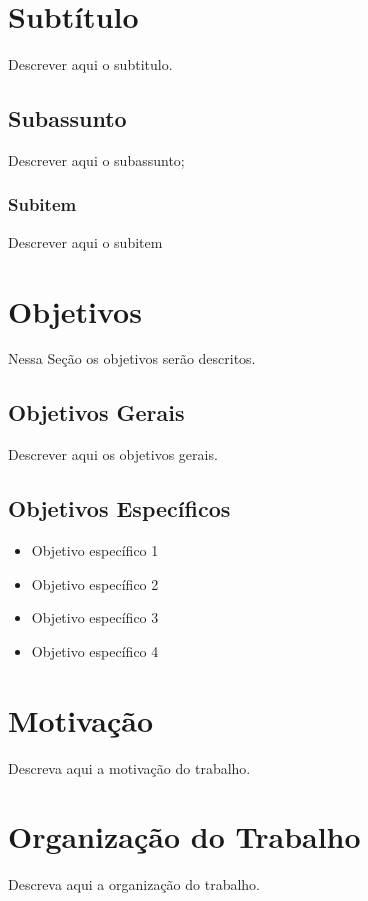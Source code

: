 \section{Subtítulo}\label{sec:subtitutlo}
Descrever aqui o subtitulo.
\subsection{Subassunto}\label{subsec:subassunto}
Descrever aqui o subassunto;
\subsubsection{Subitem}\label{subsubsec:subitem}
Descrever aqui o subitem

\section{Objetivos}\label{sec:objetivos}
Nessa Seção os objetivos serão descritos.
\subsection{Objetivos Gerais}\label{subsec:objetivos_gerais}
Descrever aqui os objetivos gerais.
\subsection{Objetivos Específicos}\label{subsec:objetivos_especificos}
\begin{itemize}
	\setlength\itemsep{-0.17cm}
	\item Objetivo específico 1
	\item Objetivo específico 2
	\item Objetivo específico 3
	\item Objetivo específico 4
\end{itemize}

\section{Motivação}\label{sec:motivacao}
Descreva aqui a motivação do trabalho.

\section{Organização do Trabalho}\label{sec:organizacao_trabalho}
Descreva aqui a organização do trabalho.